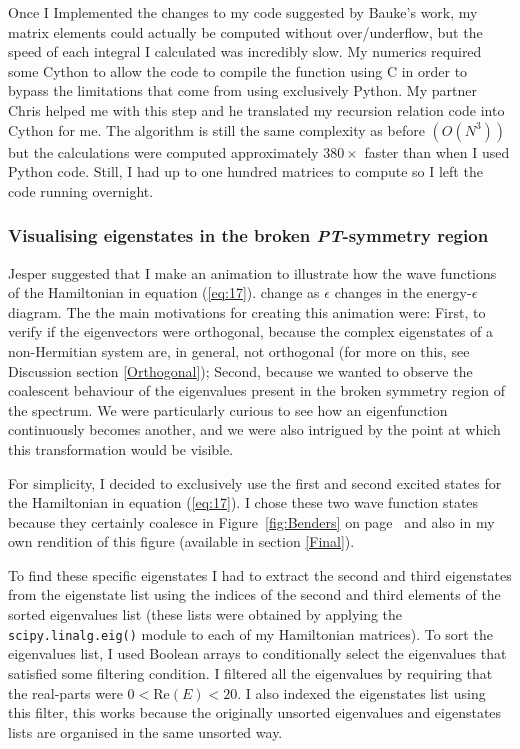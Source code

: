 \documentclass[10pt, a4paper, singlespacing]{report}
\newcommand\PT{\emph{PT}}
\begin{document}
Once I Implemented the changes to my code suggested by Bauke's work, my matrix elements could actually be computed without over/underflow, but the speed of each integral I calculated was incredibly slow. My numerics required some Cython to allow the code to compile the function using C in order to bypass the limitations that come from using exclusively Python. My partner Chris helped me with this step and he translated my recursion relation code into Cython for me. The algorithm is still the same complexity as before $(O(N^3))$ but the calculations were computed approximately $380\times$ faster than when I used Python code. Still, I had up to one hundred matrices to compute so I left the code running overnight.

\subsubsection{Visualising eigenstates in the broken \PT-symmetry region}\label{Eigenstates explained}
Jesper suggested that I make an animation to illustrate how the wave functions of the Hamiltonian in equation (\ref{eq:17}). change as $\epsilon$ changes in the energy-$\epsilon$ diagram. The the main motivations for creating this animation were: First, to verify if the eigenvectors were orthogonal, because the complex eigenstates of a non-Hermitian system are, in general, not orthogonal (for more on this, see Discussion section \ref{Orthogonal}); Second, because we wanted to observe the coalescent behaviour of the eigenvalues present in the broken symmetry region of the spectrum. We were particularly curious to see how an eigenfunction continuously becomes another, and we were also intrigued by the point at which this transformation would be visible.

For simplicity, I decided to exclusively use the first and second excited states for the Hamiltonian in equation (\ref{eq:17}). I chose these two wave function states because they certainly coalesce in Figure~\ref{fig:Benders} on page~\pageref{fig:Benders} and also in my own rendition of this figure (available in section \ref{Final}).

To find these specific eigenstates I had to extract the second and third eigenstates from the eigenstate list using the indices of the second and third elements of the sorted eigenvalues list (these lists were obtained by applying the \texttt{scipy.linalg.eig()} module to each of my Hamiltonian matrices). To sort the eigenvalues list, I used Boolean arrays to conditionally select the eigenvalues that satisfied some filtering condition. I filtered all the eigenvalues by requiring that the real-parts were $0< \mathrm{Re}(E) < 20$. I also indexed the eigenstates list using this filter, this works because the originally unsorted eigenvalues and eigenstates lists are organised in the same unsorted way.
\end{document}
